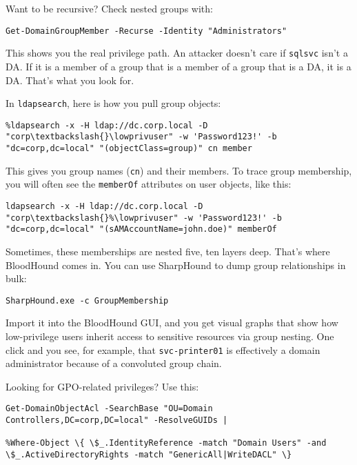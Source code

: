 Want to be recursive? Check nested groups with:

\begin{verbatim}
Get-DomainGroupMember -Recurse -Identity "Administrators"
\end{verbatim}

This shows you the real privilege path. An attacker doesn’t care if \texttt{sqlsvc} isn’t a DA. If it is a member of a group that is a member of a group that is a DA, it is a DA. That’s what you look for.

In \texttt{ldapsearch}, here is how you pull group objects:

\begin{verbatim}
%ldapsearch -x -H ldap://dc.corp.local -D "corp\textbackslash{}\lowprivuser" -w 'Password123!' -b "dc=corp,dc=local" "(objectClass=group)" cn member
\end{verbatim}

This gives you group names (\texttt{cn}) and their members. To trace group membership, you will often see the \texttt{memberOf} attributes on user objects, like this:

\begin{verbatim}
ldapsearch -x -H ldap://dc.corp.local -D "corp\textbackslash{}%\lowprivuser" -w 'Password123!' -b "dc=corp,dc=local" "(sAMAccountName=john.doe)" memberOf
\end{verbatim}

Sometimes, these memberships are nested five, ten layers deep. That’s where BloodHound comes in. You can use SharpHound to dump group relationships in bulk:

\begin{verbatim}
SharpHound.exe -c GroupMembership
\end{verbatim}

Import it into the BloodHound GUI, and you get visual graphs that show how low-privilege users inherit access to sensitive resources via group nesting. One click and you see, for example, that \texttt{svc-printer01} is effectively a domain administrator because of a convoluted group chain.

Looking for GPO-related privileges? Use this:

\begin{verbatim}
Get-DomainObjectAcl -SearchBase "OU=Domain Controllers,DC=corp,DC=local" -ResolveGUIDs | 

%Where-Object \{ \$_.IdentityReference -match "Domain Users" -and \$_.ActiveDirectoryRights -match "GenericAll|WriteDACL" \}
\end{verbatim}

